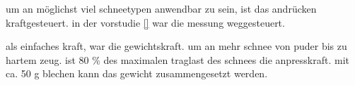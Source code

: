um an möglichst viel schneetypen anwendbar zu sein, ist das andrücken kraftgesteuert. in der vorstudie \ref{} war die messung weggesteuert.

als einfaches kraft, war die gewichtskraft. um an mehr schnee von puder bis zu hartem zeug. ist 80 \% des maximalen traglast des schnees die anpresskraft. mit ca. 50 g blechen kann das gewicht zusammengesetzt werden.
